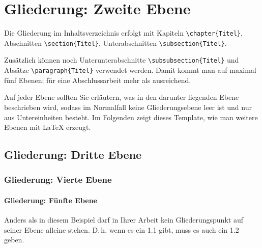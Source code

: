 \section{Gliederung: Zweite Ebene}

Die Gliederung im Inhaltsverzeichnis erfolgt mit Kapiteln \lstinline|\chapter{Titel}|, Abschnitten \lstinline|\section{Titel}|, Unterabschnitten \lstinline|\subsection{Titel}|.

Zusätzlich können noch Unterunterabschnitte \lstinline|\subsubsection{Titel}| und Absätze \lstinline|\paragraph{Titel}| verwendet werden. Damit kommt man auf maximal fünf Ebenen; für eine Abschlussarbeit mehr als ausreichend.

Auf jeder Ebene sollten Sie erläutern, was in den darunter liegenden Ebene beschrieben wird, sodass im Normalfall keine Gliederungsebene leer ist und nur aus Untereinheiten besteht. Im Folgenden zeigt dieses Template, wie man weitere Ebenen mit \LaTeX{} erzeugt.

\subsection{Gliederung: Dritte Ebene}

\label{Gliederung:EbeneDrei}


\subsubsection{Gliederung: Vierte Ebene}

\paragraph{Gliederung: Fünfte Ebene} Anders als in diesem Beispiel darf in Ihrer Arbeit kein Gliederungspunkt auf seiner Ebene alleine stehen. D.\,h. wenn es ein 1.1 gibt, muss es auch ein 1.2 geben.
